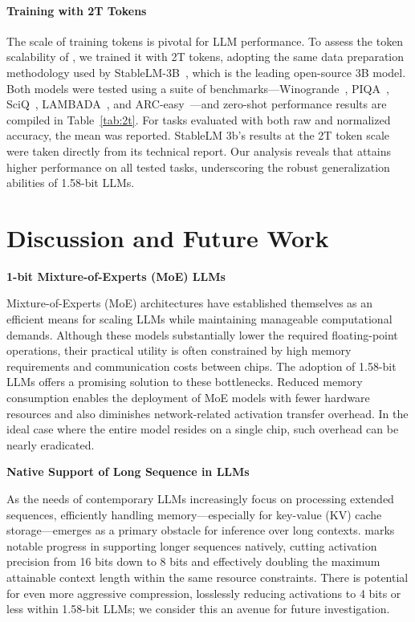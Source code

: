 \paragraph{Training with 2T Tokens}

The scale of training tokens is pivotal for LLM performance. To assess the token scalability of , we trained it with 2T tokens, adopting the same data preparation methodology used by StableLM-3B~\cite{StableLM-3B-4E1T}, which is the leading open-source 3B model. Both models were tested using a suite of benchmarks—Winogrande~\cite{winoGrande}, PIQA~\cite{piqa}, SciQ~\cite{sciq}, LAMBADA~\cite{lambada}, and ARC-easy~\cite{arc}—and zero-shot performance results are compiled in Table~\ref{tab:2t}. For tasks evaluated with both raw and normalized accuracy, the mean was reported. StableLM 3b's results at the 2T token scale were taken directly from its technical report. Our analysis reveals that  attains higher performance on all tested tasks, underscoring the robust generalization abilities of 1.58-bit LLMs.

\section{Discussion and Future Work}

\textbf{1-bit Mixture-of-Experts (MoE) LLMs}

Mixture-of-Experts (MoE) architectures have established themselves as an efficient means for scaling LLMs while maintaining manageable computational demands. Although these models substantially lower the required floating-point operations, their practical utility is often constrained by high memory requirements and communication costs between chips. The adoption of 1.58-bit LLMs offers a promising solution to these bottlenecks. Reduced memory consumption enables the deployment of MoE models with fewer hardware resources and also diminishes network-related activation transfer overhead. In the ideal case where the entire model resides on a single chip, such overhead can be nearly eradicated.

\textbf{Native Support of Long Sequence in LLMs}

As the needs of contemporary LLMs increasingly focus on processing extended sequences, efficiently handling memory—especially for key-value (KV) cache storage—emerges as a primary obstacle for inference over long contexts.  marks notable progress in supporting longer sequences natively, cutting activation precision from 16 bits down to 8 bits and effectively doubling the maximum attainable context length within the same resource constraints. There is potential for even more aggressive compression, losslessly reducing activations to 4 bits or less within 1.58-bit LLMs; we consider this an avenue for future investigation.

